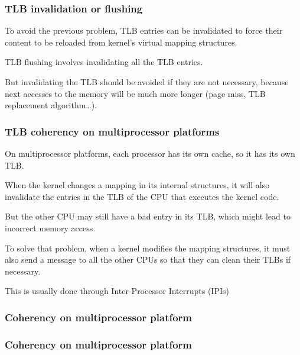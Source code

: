 \begin{frame}
  \frametitle{TLB invalidation or flushing}

  To avoid the previous problem, TLB entries can be invalidated to
  force their content to be reloaded from kernel's virtual mapping
  structures.

  \-

  TLB flushing involves invalidating all the TLB entries.

  \-

  But invalidating the TLB should be avoided if they are not necessary, because next accesses to the
  memory will be much more longer (page miss, TLB replacement algorithm\ldots).

\end{frame}


\begin{frame}
  \frametitle{TLB coherency on multiprocessor platforms}

  On multiprocessor platforms, each processor has its own cache, so it has its own TLB.

  \-

  When the kernel changes a mapping in its internal structures, it will also invalidate the entries in the TLB of the CPU that executes the kernel code.

  \-

  But the other CPU may still have a bad entry in its TLB, which might lead to incorrect memory access.

  \-

  To solve that problem, when a kernel modifies the mapping structures, it must also send a message to all the other CPUs so that they can clean their TLBs if necessary.

  \-

  This is usually done through Inter-Processor Interrupts (IPIs)

\end{frame}

\begin{frame}
  \frametitle{Coherency on multiprocessor platform}

  \begin{center}
  \end{center}

\end{frame}

\begin{frame}
  \frametitle{Coherency on multiprocessor platform}

  \begin{center}
  \end{center}

\end{frame}

